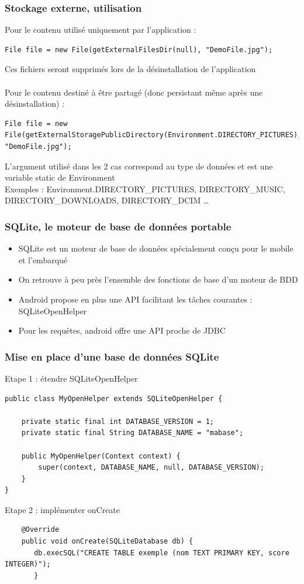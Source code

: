 \documentclass{beamer}
\begin{document}
\begin{frame}[fragile]
\frametitle{Stockage externe, utilisation}
Pour le contenu utilisé uniquement par l'application :
\begin{lstlisting}
File file = new File(getExternalFilesDir(null), "DemoFile.jpg");
\end{lstlisting}
Ces fichiers seront supprimés lors de la désinstallation de l'application\\\\
Pour le contenu destiné à être partagé (donc persistant même après une
désinstallation) :
\begin{lstlisting}
File file = new File(getExternalStoragePublicDirectory(Environment.DIRECTORY_PICTURES), "DemoFile.jpg");
\end{lstlisting}
L'argument utilisé dans les 2 cas correspond au type de données et est une variable static de Environment\\
Exemples : Environment.DIRECTORY\_PICTURES, DIRECTORY\_MUSIC, DIRECTORY\_DOWNLOADS, DIRECTORY\_DCIM \ldots
\end{frame}
\begin{frame}[fragile]
\frametitle{SQLite, le moteur de base de données portable}
\begin{itemize}
    \item SQLite est un moteur de base de données spécialement conçu pour le
    mobile et l'embarqué
    \item On retrouve à peu près l'ensemble des fonctions de base d'un moteur de BDD
    \item Android propose en plus une API facilitant les tâches courantes : SQLiteOpenHelper
    \item Pour les requêtes, android offre une API proche de JDBC
\end{itemize}
\end{frame}
\begin{frame}[fragile]
\frametitle{Mise en place d'une base de données SQLite}
Etape 1 : étendre SQLiteOpenHelper 
\begin{lstlisting}
public class MyOpenHelper extends SQLiteOpenHelper {

    private static final int DATABASE_VERSION = 1;
    private static final String DATABASE_NAME = "mabase";

    public MyOpenHelper(Context context) {
        super(context, DATABASE_NAME, null, DATABASE_VERSION);
    }
}
\end{lstlisting}
Etape 2 : implémenter onCreate
\begin{lstlisting}
    @Override
    public void onCreate(SQLiteDatabase db) {
       db.execSQL("CREATE TABLE exemple (nom TEXT PRIMARY KEY, score INTEGER)");
       }
\end{lstlisting}
\end{frame}
\end{document}
